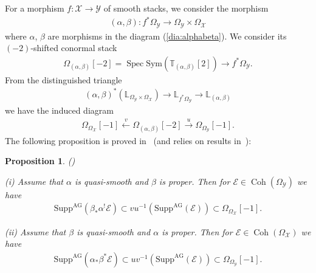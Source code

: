 \documentclass [11pt,oneside,a4paper,mathscr]{amsart}
\newtheorem{prop}[thm]{Proposition}
\theoremstyle{definition}
\newcommand{\Y}{\mathcal{Y}}
\newcommand{\X}{\mathcal{X}}
\newcommand{\Coh}{\operatorname{Coh}}
\newcommand{\Spec}{\operatorname{Spec}}
\begin{document}
For a morphism $f\colon \X \to \Y$ of smooth stacks, 
we consider the morphism 
\begin{align*}
    (\alpha, \beta) \colon f^{*}\Omega_{\Y} \to \Omega_{\Y}\times \Omega_{\X}
\end{align*}
where $\alpha$, $\beta$ are morphisms in the diagram (\ref{dia:alphabeta}). 
We consider its $(-2)$-shifted conormal stack 
\begin{align}\label{def:-2}
    \Omega_{(\alpha, \beta)}[-2]=\Spec \mathrm{Sym}(\mathbb{T}_{(\alpha, \beta)}[2]) \to f^*\Omega_{\Y}.
\end{align}
From the distinguished triangle 
\begin{align*}
    (\alpha, \beta)^*(\mathbb{L}_{\Omega_{\Y}\times \Omega_{\X}}) \to  \mathbb{L}_{f^{*}\Omega_{\Y}} \to \mathbb{L}_{(\alpha, \beta)}
\end{align*}
we have the induced diagram 
\begin{align*}
    \Omega_{\Omega_{\X}}[-1] \stackrel{v}{\leftarrow} \Omega_{(\alpha, \beta)}[-2] \stackrel{u}{\to} 
    \Omega_{\Omega_{\Y}}[-1].
\end{align*}
The following proposition is proved in~\cite{T2} (and relies on results in~\cite{AG}):
\begin{prop}\emph{(\cite[Proposition~2.4]{T2})}\label{prop:singss}

(i) Assume that $\alpha$ is quasi-smooth and $\beta$ is proper. 
Then for $\mathcal{E} \in \Coh(\Omega_{\Y})$ we have 
\begin{align*}
    \mathrm{Supp}^{\mathrm{AG}}(\beta_{*}\alpha^! \mathcal{E}) \subset vu^{-1}(\mathrm{Supp}^{\mathrm{AG}}(\mathcal{E}))
    \subset \Omega_{\Omega_{\X}}[-1].
\end{align*}

(ii) Assume that $\beta$ is quasi-smooth and $\alpha$ is proper. 
Then for $\mathcal{E} \in \Coh(\Omega_{\X})$ we have 
\begin{align*}
    \mathrm{Supp}^{\mathrm{AG}}(\alpha_{*}\beta^* \mathcal{E}) \subset uv^{-1}(\mathrm{Supp}^{\mathrm{AG}}(\mathcal{E}))
    \subset \Omega_{\Omega_{\Y}}[-1].
\end{align*}    
\end{prop}
\end{document}
